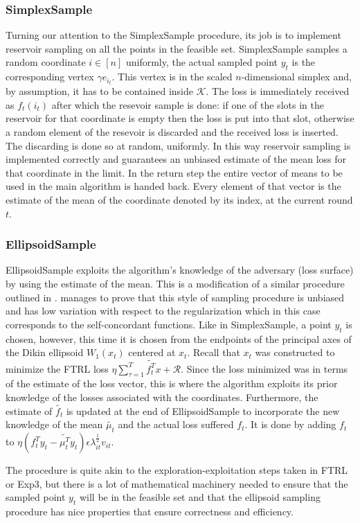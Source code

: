 \subsubsection{SimplexSample}
Turning our attention to the SimplexSample procedure, its job is to implement reservoir sampling on all the points in the feasible set. SimplexSample samples a random coordinate $i \in [n]$ uniformly, the actual sampled point $y_t$ is the corresponding vertex $\gamma e_{i_t}$. This vertex is in the scaled $n$-dimensional simplex and, by assumption, it has to be contained inside $\mathcal{K}$. The loss is immediately received as $f_t(i_t)$ after which the resevoir sample is done: if one of the slots in the reservoir for that coordinate is empty then the loss is put into that slot, otherwise a random element of the resevoir is discarded and the received loss is inserted. The discarding  is done so at random, uniformly. In this way reservoir sampling is implemented correctly and guarantees an unbiased estimate of the mean loss for that coordinate in the limit. In the return step the entire vector of means to be used in the main algorithm is handed back. Every element of that vector is the estimate of the mean of the coordinate denoted by its index, at the current round $t$.
 
\subsubsection{EllipsoidSample}
EllipsoidSample exploits the algorithm's knowledge of the adversary (loss surface) by using the estimate of the mean. This is a modification of a similar procedure outlined in \citep{abernethy}. \citep{abernethy} manages to prove that this style of sampling procedure is unbiased and has low variation with respect to the regularization which in this case corresponds to the self-concordant functions. Like in SimplexSample, a point $y_t$ is chosen, however, this time it is chosen from the endpoints of the principal axes of the Dikin ellipsoid $W_1(x_t)$ centered at $x_t$. Recall that $x_t$ was constructed to minimize the FTRL loss $\eta \sum_{\tau=1}^T\tilde{f_t^T}x +\mathcal{R}$. Since the loss minimized was in terms of the estimate of the loss vector, this is where the algorithm exploits its prior knowledge of the losses associated with the coordinates. Furthermore, the estimate of $\tilde{f_t}$ is updated at the end of EllipsoidSample to incorporate the new knowledge of the mean $\tilde{\mu_t}$ and the actual loss suffered $f_t$. It is done by adding $f_t$ to $\eta (f_{t}^Ty_t - \tilde{\mu_{t}^T}y_t)\epsilon \lambda_{it}^{\frac{1}{2}}v_{it}$.

The procedure is quite akin to the exploration-exploitation steps taken in FTRL or Exp3, but there is a lot of mathematical machinery needed to ensure that the sampled point $y_t$ will be in the feasible set and that the ellipsoid sampling procedure has nice properties that ensure correctness and efficiency. 
